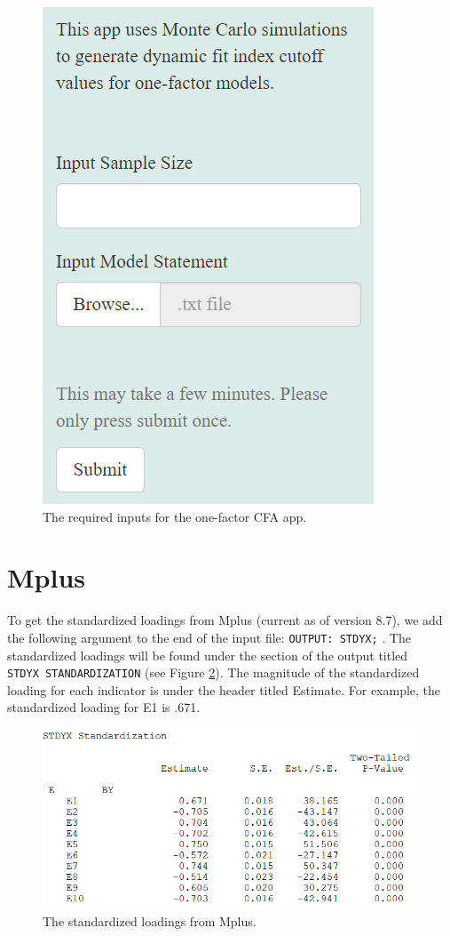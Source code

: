 \documentclass[
]{book}
\begin{document}
\begin{figure}

{\centering \includegraphics[width=0.4\linewidth]{inputs} 

}

\caption{The required inputs for the one-factor CFA app.}\label{fig:inputs}
\end{figure}

\hypertarget{mplus}{%
\section{Mplus}\label{mplus}}

To get the standardized loadings from Mplus (current as of version 8.7), we add the following argument to the end of the input file: \texttt{OUTPUT:\ STDYX;} . The standardized loadings will be found under the section of the output titled \texttt{STDYX\ STANDARDIZATION} (see Figure \ref{fig:mplus}). The magnitude of the standardized loading for each indicator is under the header titled Estimate. For example, the standardized loading for E1 is .671.

\begin{figure}

{\centering \includegraphics[width=0.7\linewidth]{mplus} 

}

\caption{The standardized loadings from Mplus.}\label{fig:mplus}
\end{figure}
\end{document}
